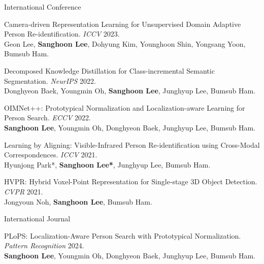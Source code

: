 
\begin{cventries}

\cventry
    {} %
    {International Conference} %
    {} %
    {} %
    {
      \begin{cvitems} %
        \item {Camera-driven Representation Learning for Unsupervised Domain Adaptive Person Re-identification. \textit{ICCV} 2023.\\ Geon Lee, \textbf{Sanghoon Lee}, Dohyung Kim, Younghoon Shin, Yongsang Yoon, Bumsub Ham.}\\
        \item {Decomposed Knowledge Distillation for Class-incremental Semantic Segmentation. \textit{NeurIPS} 2022.\\ Donghyeon Baek, Youngmin Oh, \textbf{Sanghoon Lee}, Junghyup Lee, Bumsub Ham.}\\
        \item {OIMNet++: Prototypical Normalization and Localization-aware Learning for Person Search. \textit{ECCV} 2022.\\ \textbf{Sanghoon Lee}, Youngmin Oh, Donghyeon Baek, Junghyup Lee, Bumsub Ham.}\\
        \item {Learning by Aligning: Visible-Infrared Person Re-identification using Cross-Modal Correspondences. \textit{ICCV} 2021.\\ Hyunjong Park*, \textbf{Sanghoon Lee*}, Junghyup Lee, Bumsub Ham.}\\
        \item {HVPR: Hybrid Voxel-Point Representation for Single-stage 3D Object Detection. \textit{CVPR} 2021.\\ Jongyoun Noh, \textbf{Sanghoon Lee}, Bumsub Ham.}\\
      \end{cvitems}
    }

\cventry
    {} %
    {International Journal} %
    {} %
    {} %
    {
      \begin{cvitems} %
        \item {PLoPS: Localization-Aware Person Search with Prototypical Normalization. \textit{Pattern Recognition} 2024.\\ \textbf{Sanghoon Lee}, Youngmin Oh, Donghyeon Baek, Junghyup Lee, Bumsub Ham.}
      \end{cvitems}
    }



\end{cventries}
